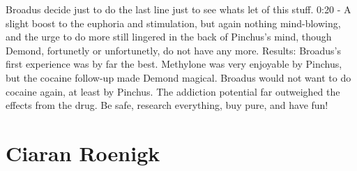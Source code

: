 \documentclass[12pt]{book}
\begin{document}
Broadus decide just to do the last line just to see whats let of this stuff. 0:20 - A slight boost to the euphoria and stimulation, but again nothing mind-blowing, and the urge to do more still lingered in the back of Pinchus's mind, though Demond, fortunetly or unfortunetly, do not have any more. Results: Broadus's first experience was by far the best. Methylone was very enjoyable by Pinchus, but the cocaine follow-up made Demond magical. Broadus would not want to do cocaine again, at least by Pinchus. The addiction potential far outweighed the effects from the drug. Be safe, research everything, buy pure, and have fun!



\chapter{Ciaran Roenigk}
\end{document}
